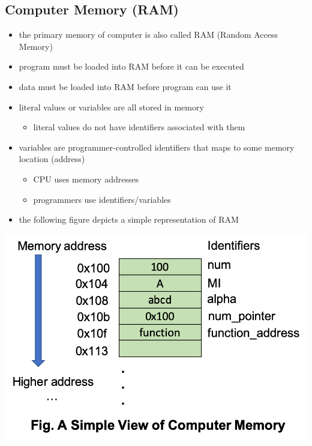 \documentclass[11pt]{article}
\providecommand{\tightlist}{%
      \setlength{\itemsep}{0pt}\setlength{\parskip}{0pt}}
\begin{document}
    \hypertarget{computer-memory-ram}{%
\subsection{Computer Memory (RAM)}\label{computer-memory-ram}}

\begin{itemize}
\tightlist
\item
  the primary memory of computer is also called RAM (Random Access
  Memory)
\item
  program must be loaded into RAM before it can be executed
\item
  data must be loaded into RAM before program can use it
\item
  literal values or variables are all stored in memory

  \begin{itemize}
  \tightlist
  \item
    literal values do not have identifiers associated with them
  \end{itemize}
\item
  variables are programmer-controlled identifiers that maps to some
  memory location (address)

  \begin{itemize}
  \tightlist
  \item
    CPU uses memory addresses
  \item
    programmers use identifiers/variables
  \end{itemize}
\item
  the following figure depicts a simple representation of RAM
\end{itemize}

\includegraphics{resources/memory-layout.png}
\end{document}
